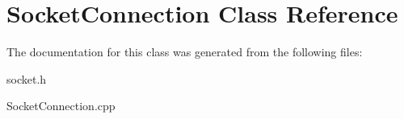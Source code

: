\hypertarget{class_socket_connection}{\section{Socket\-Connection Class Reference}
\label{class_socket_connection}
}


The documentation for this class was generated from the following files\-:\begin{DoxyCompactItemize}
\item 
socket.\-h\item 
Socket\-Connection.\-cpp\end{DoxyCompactItemize}
